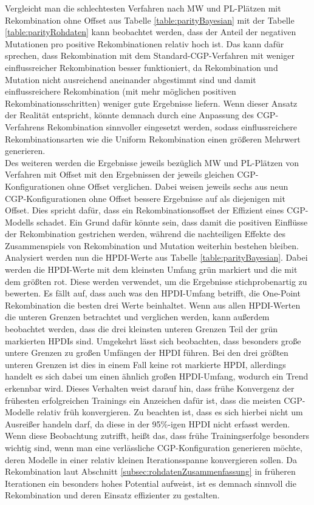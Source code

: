 Vergleicht man die schlechtesten Verfahren nach MW und PL-Plätzen mit Rekombination ohne Offset aus Tabelle \ref{table:parityBayesian} mit der Tabelle \ref{table:parityRohdaten} kann beobachtet werden, dass der Anteil der negativen Mutationen pro positive Rekombinationen relativ hoch ist.
Das kann dafür sprechen, dass Rekombination mit dem Standard-CGP-Verfahren mit weniger einflussreicher Rekombination besser funktioniert, da Rekombination und Mutation nicht ausreichend aneinander abgestimmt sind und damit einflussreichere Rekombination (mit mehr möglichen positiven Rekombinationsschritten) weniger gute Ergebnisse liefern.
Wenn dieser Ansatz der Realität entspricht, könnte demnach durch eine Anpassung des CGP-Verfahrens Rekombination sinnvoller eingesetzt werden, sodass einflussreichere Rekombinationsarten wie die Uniform Rekombination einen größeren Mehrwert generieren.\\
Des weiteren werden die Ergebnisse jeweils bezüglich MW und PL-Plätzen von Verfahren mit Offset mit den Ergebnissen der jeweils gleichen CGP-Konfigurationen ohne Offset verglichen.
Dabei weisen jeweils sechs aus neun CGP-Konfigurationen ohne Offset bessere Ergebnisse auf als diejenigen mit Offset.
Dies spricht dafür, dass ein Rekombinationsoffset der Effizient eines CGP-Modells schadet.
Ein Grund dafür könnte sein, dass damit die positiven Einflüsse der Rekombination gestrichen werden, während die nachteiligen Effekte des Zusammenspiels von Rekombination und Mutation weiterhin bestehen bleiben.\\
Analysiert werden nun die HPDI-Werte aus Tabelle \ref{table:parityBayesian}.
Dabei werden die HPDI-Werte mit dem kleinsten Umfang grün markiert und die mit dem größten rot.
Diese werden verwendet, um die Ergebnisse stichprobenartig zu bewerten.
Es fällt auf, dass auch was den HPDI-Umfang betrifft, die One-Point Rekombination die besten drei Werte beinhaltet.
Wenn aus allen HPDI-Werten die unteren Grenzen betrachtet und verglichen werden, kann außerdem beobachtet werden, dass die drei kleinsten unteren Grenzen Teil der grün markierten HPDIs sind.
Umgekehrt lässt sich beobachten, dass besonders große untere Grenzen zu großen Umfängen der HPDI führen.
Bei den drei größten unteren Grenzen ist dies in einem Fall keine rot markierte HPDI, allerdings handelt es sich dabei um einen ähnlich großen HPDI-Umfang, wodurch ein Trend erkennbar wird.
Dieses Verhalten weist darauf hin, dass frühe Konvergenz der frühesten erfolgreichen Trainings ein Anzeichen dafür ist, dass die meisten CGP-Modelle relativ früh konvergieren.
Zu beachten ist, dass es sich hierbei nicht um Ausreißer handeln darf, da diese in der 95\%-igen HPDI nicht erfasst werden.
Wenn diese Beobachtung zutrifft, heißt das, dass frühe Trainingserfolge besonders wichtig sind, wenn man eine verlässliche CGP-Konfiguration generieren möchte, deren Modelle in einer relativ kleinen Iterationsspanne konvergieren sollen.
Da Rekombination laut Abschnitt \ref{subsec:rohdatenZusammenfassung} in früheren Iterationen ein besonders hohes Potential aufweist, ist es demnach sinnvoll die Rekombination und deren Einsatz effizienter zu gestalten.

